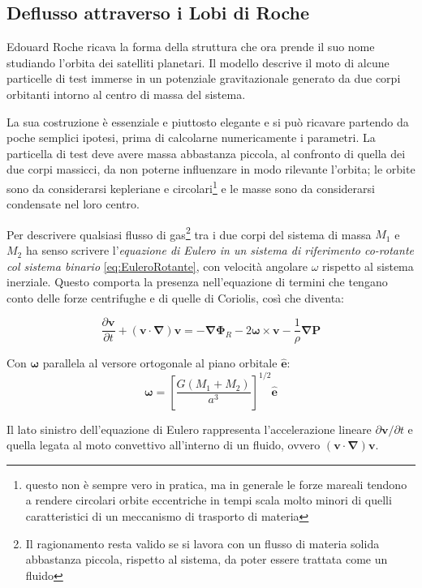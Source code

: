 \documentclass[a4paperbi]{article}
\begin{document}
\subsection{Deflusso attraverso i Lobi di Roche}
	Edouard Roche ricava la forma della struttura che ora prende il suo nome studiando l'orbita dei satelliti planetari. Il modello descrive il moto di alcune particelle di test immerse in un potenziale gravitazionale generato da due corpi orbitanti intorno al centro di massa del sistema.
	
	La sua costruzione è essenziale e piuttosto elegante e si può ricavare partendo da poche semplici ipotesi, prima di calcolarne numericamente i parametri. La particella di test deve avere massa abbastanza piccola, al confronto di quella dei due corpi massicci, da non poterne influenzare in modo rilevante l'orbita; le orbite sono da considerarsi kepleriane e circolari\footnote{questo non è sempre vero in pratica, ma in generale le forze mareali tendono a rendere circolari orbite eccentriche in tempi scala molto minori di quelli caratteristici di un meccanismo di trasporto di materia} e le masse sono da considerarsi condensate nel loro centro.
	
	Per descrivere qualsiasi flusso di gas\footnote{Il ragionamento resta valido se si lavora con un flusso di materia solida abbastanza piccola, rispetto al sistema, da poter essere trattata come un fluido} tra i due corpi del sistema di massa $M_1$ e $M_2$ ha senso scrivere l'\textit{equazione di Eulero in un sistema di riferimento co-rotante col sistema binario} \eqref{eq:EuleroRotante}, con velocità angolare $\omega$ rispetto al sistema inerziale. Questo comporta la presenza nell'equazione di termini che tengano conto delle forze centrifughe e di quelle di Coriolis, così che diventa:
	
	\begin{equation}\label{eq:EuleroRotante}
		\frac{\partial \bm{v}}{\partial t}+(\bm{v}\cdot\bm{\nabla})\bm{v}=-\bm{\nabla}\bm{\Phi}_R-2\bm{\omega}\times\bm{v}-\frac{1}{\rho}\bm{\nabla}\bm{P}
	\end{equation}
	
	Con $\bm{\omega}$ parallela al versore ortogonale al piano orbitale $\bm{\hat{e}}$:
	\begin{equation}
		\bm{\omega}=\left[\frac{G(M_1+M_2)}{a^3}\right]^{1/2}\bm{\hat{e}}
	\end{equation}
		
	Il lato sinistro dell'equazione di Eulero rappresenta l'accelerazione lineare $\partial \bm{v}/\partial t$ e quella legata al moto convettivo all'interno di un fluido, ovvero $(\bm{v}\cdot\bm{\nabla})\bm{v}$. 
	
\end{document}
